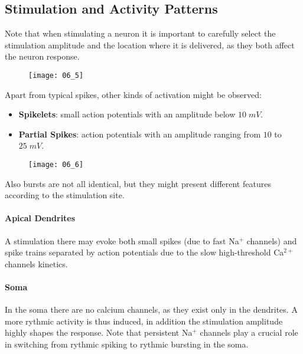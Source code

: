 \subsection{Stimulation and Activity Patterns}
Note that when stimulating a neuron it is important to carefully select the stimulation
amplitude and the location where it is delivered, as they both affect the neuron response.
\begin{figure}[H]
    \texttt{[image: 06\_5]}
    \centering
\end{figure}
Apart from typical spikes, other kinds of activation might be observed:
\begin{itemize}
    \item \textbf{Spikelets}: small action potentials with an amplitude below \(10\;mV\).
    \item \textbf{Partial Spikes}: action potentials with an amplitude ranging from \(10\)
          to \(25\;mV\).
\end{itemize}
\begin{figure}[H]
    \texttt{[image: 06\_6]}
    \centering
\end{figure}
Also bursts are not all identical, but they might present different features according to
the stimulation site.
\paragraph{Apical Dendrites} A stimulation there may evoke both small spikes (due to fast
Na\({}^{+}\) channels) and spike trains separated by action potentials due to the
slow high-threshold Ca\({}^{2+}\) channels kinetics.
\paragraph{Soma} In the soma there are no calcium channels, as they exist only in the
dendrites. A more rythmic activity is thus induced, in addition the stimulation amplitude
highly shapes the response. Note that persistent Na\({}^{+}\) channels play a crucial role
in switching from rythmic spiking to rythmic bursting in the soma.